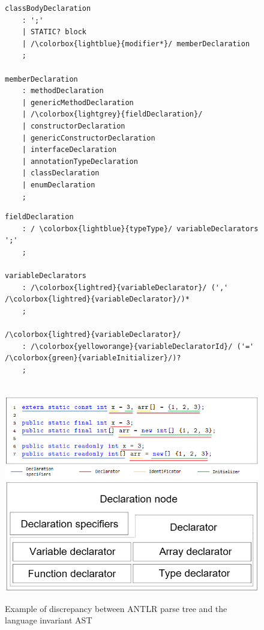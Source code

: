 \documentclass[a4paper]{article}
\begin{document}
\begin{figure}[H]
\begin{lstlisting}
classBodyDeclaration
    : ';'
    | STATIC? block
    | /\colorbox{lightblue}{modifier*}/ memberDeclaration
    ;
    
memberDeclaration
    : methodDeclaration
    | genericMethodDeclaration
    | /\colorbox{lightgrey}{fieldDeclaration}/
    | constructorDeclaration
    | genericConstructorDeclaration
    | interfaceDeclaration
    | annotationTypeDeclaration
    | classDeclaration
    | enumDeclaration
    ;
\end{lstlisting}

\begin{lstlisting}
fieldDeclaration
    : / \colorbox{lightblue}{typeType}/ variableDeclarators ';'
    ;
    
variableDeclarators
    : /\colorbox{lightred}{variableDeclarator}/ (',' /\colorbox{lightred}{variableDeclarator}/)*
    ;

/\colorbox{lightred}{variableDeclarator}/
    : /\colorbox{yelloworange}{variableDeclaratorId}/ ('=' /\colorbox{green}{variableInitializer}/)?
    ;
    
\end{lstlisting}

\includegraphics[width=\textwidth]{declaration_decomposition_v2.png}
\includegraphics[width=\textwidth]{declaration_nodes_v4.png}

\caption{Example of discrepancy between ANTLR parse tree and the language invariant AST}
\label{fig:example}
\end{figure}
\end{document}
